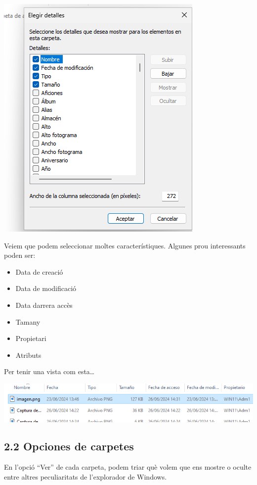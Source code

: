 \documentclass[
  a4paper,
]{article}
\providecommand{\tightlist}{%
  \setlength{\itemsep}{0pt}\setlength{\parskip}{0pt}}
\begin{document}
\includegraphics{png/elegirDetalles.png}

Veiem que podem seleccionar moltes característiques. Algunes prou
interessants poden ser:

\begin{itemize}
\tightlist
\item
  Data de creació
\item
  Data de modificació
\item
  Data darrera accès
\item
  Tamany
\item
  Propietari
\item
  Atributs
\end{itemize}

Per tenir una vista com esta\ldots{}

\includegraphics{png/DetallesBarra.png}

\subsection{2.2 Opciones de carpetes}\label{opciones-de-carpetes}

En l'opció ``Ver'' de cada carpeta, podem triar què volem que ens mostre
o oculte entre altres peculiaritats de l'explorador de Windows.
\end{document}

